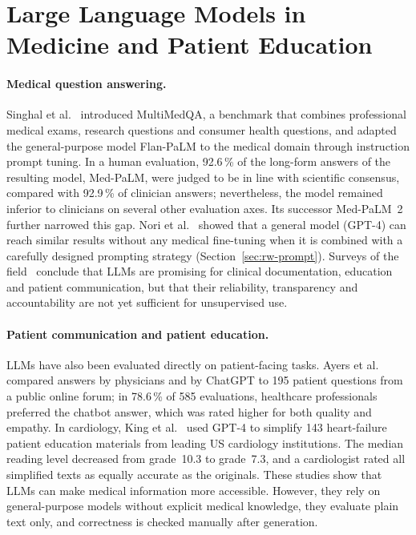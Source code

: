 \section{Large Language Models in Medicine and Patient Education}
\label{sec:rw-medical-llm}

\paragraph{Medical question answering.}
Singhal et al.~\cite{singhal2023large} introduced MultiMedQA, a benchmark that
combines professional medical exams, research questions and consumer health
questions, and adapted the general-purpose model Flan-PaLM to the medical
domain through instruction prompt tuning. In a human evaluation, 92.6\,\% of
the long-form answers of the resulting model, Med-PaLM, were judged to be in
line with scientific consensus, compared with 92.9\,\% of clinician answers;
nevertheless, the model remained inferior to clinicians on several other
evaluation axes. Its successor
Med-PaLM~2~\cite{singhal2025toward} further narrowed this gap. Nori et
al.~\cite{nori2023can} showed that a general model (GPT-4) can reach similar
results without any medical fine-tuning when it is combined with a carefully
designed prompting strategy (Section~\ref{sec:rw-prompt}). Surveys of the
field~\cite{thirunavukarasu2023large} conclude that LLMs are promising for
clinical documentation, education and patient communication, but that their
reliability, transparency and accountability are not yet sufficient for
unsupervised use.

\paragraph{Patient communication and patient education.}
LLMs have also been evaluated directly on patient-facing tasks. Ayers et
al.~\cite{ayers2023comparing} compared answers by physicians and by ChatGPT to
195 patient questions from a public online forum; in 78.6\,\% of 585
evaluations, healthcare professionals preferred the chatbot answer, which was
rated higher for both quality and empathy. In cardiology, King et
al.~\cite{king2025improving} used GPT-4 to simplify 143 heart-failure patient
education materials from leading US cardiology institutions. The median
reading level decreased from grade~10.3 to grade~7.3, and a cardiologist rated
all simplified texts as equally accurate as the originals. These studies show
that LLMs can make medical information more accessible. However, they rely
on general-purpose models without explicit medical knowledge, they evaluate
plain text only, and correctness is checked manually after generation.

